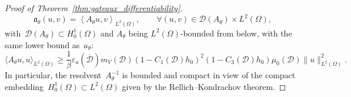 \documentclass[a4]{article}
\newcommand{\fa}{\mathfrak{a}}
\newcommand{\1}{\mathbbm 1}
\begin{document}
\begin{proof}[Proof of Theorem~\ref{thm:gateaux_differentiability}]
    \begin{equation}
        \label{eq:def_a_theta}
        \fa_\theta(u,v) = \left\langle A_\theta u,v\right\rangle_{L^2(\Omega)},\qquad \forall (u,v)\in \mathcal D(A_\theta)\times L^2(\Omega),
    \end{equation}
    with~$\mathcal D(A_\theta)\subset H_0^1(\Omega)$ and $A_\theta$ being $L^2(\Omega)$-bounded from below, with the same lower bound as~$a_\theta$:
    \begin{equation}
        \label{eq:A_lower_bound}
        \langle A_\theta u,u\rangle_{L^2(\Omega)} \geq \frac1\beta\varepsilon_a(\overline{\mathcal D}) m_V(\mathcal D) (1-C_1(\mathcal D)h_0)^2(1-C_3(\mathcal D)h_0) \mu_0(\mathcal D)\|u\|^2_{L^2(\Omega)}.
    \end{equation}
    In particular, the resolvent~$A_\theta^{-1}$ is bounded and compact in view of the compact embedding~$H_0^1(\Omega)\subset L^2(\Omega)$ given by the Rellich--Kondrachov theorem.


\end{proof}
\end{document}
